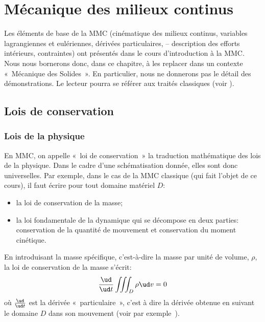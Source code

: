 \chapter{Mécanique des milieux continus} \label{chap:Ch01}
Les éléments de base de la MMC (cinématique des milieux continus, variables lagrangiennes et eulériennes, dérivées particulaires, -- description des efforts intérieurs, contraintes) ont présentés dans le cours d'introduction à la MMC.
Nous nous bornerons donc, dans ce chapitre, à les replacer dans un contexte «~Mécanique des Solides~». 
En particulier, nous ne donnerons pas le détail des démonstrations. 
Le lecteur pourra se référer aux traités classiques (voir \cite{Germain-62,Germain-73,Mandel-66,Mandel-74,Gontier-69,Roy-66,Sedov-71,Eringen-67,Prager-61,Lai-78}).
\section{Lois de conservation} \label{sec:Ch01-1}
\subsection{Lois de la physique} \label{ssec:Ch01-1.1}
En MMC, on appelle «~loi de conservation~» la traduction mathématique des lois de la physique.
Dans le cadre d'une schématisation donnée, elles sont donc universelles. 
Par exemple, dans le cas de la MMC classique (qui fait l'objet de ce cours), il faut écrire pour tout domaine matériel $D$:
\begin{itemize}
    \item la loi de conservation de la masse;
    \item la loi fondamentale de la dynamique qui se décompose en deux parties: conservation de la quantité de mouvement et conservation du moment cinétique.
\end{itemize}
En introduisant la masse spécifique, c'est-à-dire la masse par unité de volume, $\rho$, la loi de conservation de la masse s'écrit:
\begin{equation}
    \frac{\ud}{\ud t}\iiint_D \rho \ud v =0
    \label{eq:Ch01-001}
\end{equation}
où $\frac{\ud}{\ud t}$ est la dérivée «~particulaire~», c'est à dire la dérivée obtenue en suivant le domaine $D$ dans son mouvement (voir par exemple~\cite{Germain-73}).

